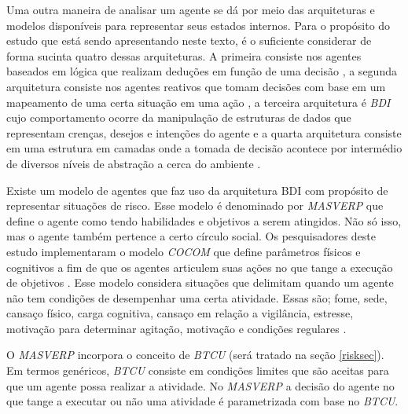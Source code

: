 Uma outra maneira de analisar um agente se dá por meio das arquiteturas e modelos disponíveis para representar seus estados internos. Para o propósito do estudo que está sendo apresentando neste texto, é o suficiente considerar de forma sucinta quatro dessas arquiteturas. A primeira consiste nos agentes baseados em lógica que realizam deduções em função de uma decisão \cite{logicagent}, a segunda arquitetura consiste nos agentes reativos que tomam decisões com base em um mapeamento de uma certa situação em uma  ação \cite{reactiveagent}, a terceira arquitetura é \textit{BDI} cujo comportamento ocorre da manipulação de estruturas de dados que representam crenças, desejos e intenções do agente \cite{bdi} e a quarta arquitetura consiste em uma estrutura em camadas onde a tomada de decisão acontece por intermédio de diversos níveis de abstração a cerca do ambiente \cite{layeragent} \cite{whatisagent}.  

Existe um modelo de agentes que faz uso da arquitetura BDI com propósito de representar situações de risco. Esse modelo é denominado por \textit{MASVERP} que define o agente como tendo habilidades e objetivos a serem atingidos. Não só isso, mas o agente também pertence a certo círculo social. Os pesquisadores deste estudo implementaram o modelo \textit{COCOM} que define parâmetros físicos e cognitivos a fim de que os agentes articulem suas ações no que tange a execução de objetivos \cite{mavesp}. Esse modelo considera situações que delimitam quando um agente não tem condições de desempenhar uma certa atividade. Essas são; fome, sede, cansaço físico, carga cognitiva, cansaço em relação a vigilância, estresse, motivação para determinar agitação, motivação e condições regulares \cite{mavesp}. 

O \textit{MASVERP} incorpora o conceito de \textit{BTCU} (será tratado na seção \ref{risksec}). Em termos genéricos, \textit{BTCU} consiste em condições limites que são aceitas para que um agente possa realizar a atividade. No \textit{MASVERP} a decisão do agente no que tange a executar ou não uma atividade é parametrizada com base no \textit{BTCU}. 